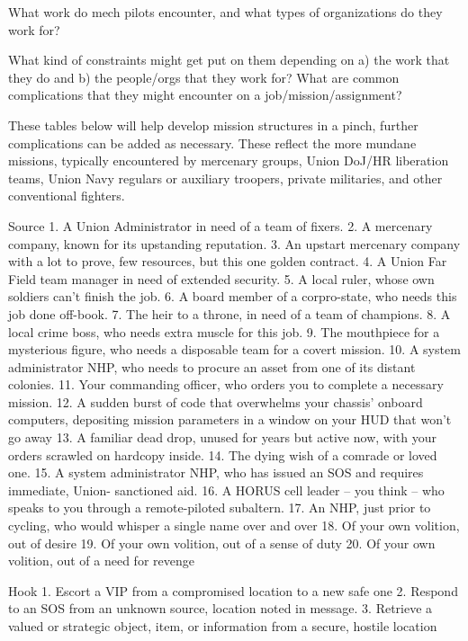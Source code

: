 What work do mech pilots encounter, and what types of organizations do they work for?   

What kind of constraints might get put on them depending on a) the work that they do and b) the  
people/orgs that they work for? What are common complications that they might encounter on a  
job/mission/assignment?  

These tables below will help develop mission structures in a pinch, further complications can be  
added as necessary. These reflect the more mundane missions, typically encountered by  
mercenary groups, Union DoJ/HR liberation teams, Union Navy regulars or auxiliary troopers,  
private militaries, and other conventional fighters.    

Source  
    1.  A Union Administrator in need of a team of fixers.  
    2.  A mercenary company, known for its upstanding reputation.   
    3.  An upstart mercenary company with a lot to prove, few resources, but this one golden  
        contract.  
    4.  A Union Far Field team manager in need of extended security.  
    5.  A local ruler, whose own soldiers can’t finish the job.  
    6.  A board member of a corpro-state, who needs this job done off-book.   
    7.  The heir to a throne, in need of a team of champions.  
    8.  A local crime boss, who needs extra muscle for this job.  
    9.  The mouthpiece for a mysterious figure, who needs a disposable team for a covert  
        mission.  
    10. A system administrator NHP, who needs to procure an asset from one of its distant  
        colonies.  
    11. Your commanding officer, who orders you to complete a necessary mission.   
    12. A sudden burst of code that overwhelms your chassis’ onboard computers, depositing  
        mission parameters in a window on your HUD that won’t go away  
    13. A familiar dead drop, unused for years but active now, with your orders scrawled on  
        hardcopy inside.   
    14. The dying wish of a comrade or loved one.   
    15. A system administrator NHP, who has issued an SOS and requires immediate, Union- 
        sanctioned aid.   
    16. A HORUS cell leader -- you think -- who speaks to you through a remote-piloted subaltern.    
    17. An NHP, just prior to cycling, who would whisper a single name over and over  
    18. Of your own volition, out of desire  
    19. Of your own volition, out of a sense of duty  
    20. Of your own volition, out of a need for revenge  

Hook  
    1.  Escort a VIP from a compromised location to a new safe one  
    2.  Respond to an SOS from an unknown source, location noted in message.   
    3.  Retrieve a valued or strategic object, item, or information from a secure, hostile location  


